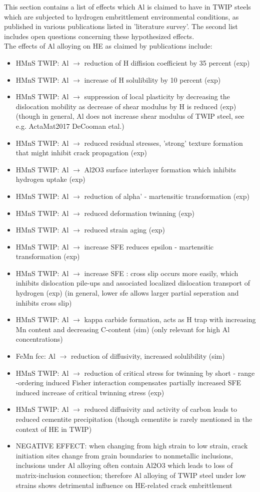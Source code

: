 \documentclass[11pt,floatfix,showpacs]{amsart}
\begin{document}
This section contains a list of effects which Al is claimed to have in TWIP steels which are subjected to hydrogen embrittlement 
environmental conditions, as published in various publications listed in 'literature survey'. The second list includes open questions concerning these hypothesized effects.\\


The effects of Al alloying on HE as claimed by publications include:
\begin{itemize}
\item HMnS TWIP: Al $\to$ reduction of H diffision coefficient by 35 percent (exp)
\item HMnS TWIP: Al $\to$ increase of H solulibility by 10 percent (exp)
\item HMnS TWIP: Al $\to$ suppression of local plasticity by decreasing the dislocation mobility as decrease of shear modulus by H is reduced (exp) (though in general, Al does not increase shear modulus of TWIP steel, see e.g. ActaMat2017 DeCooman etal.)
\item HMnS TWIP: Al $\to$ reduced residual stresses, 'strong' texture formation that might inhibit crack propagation (exp)
\item HMnS TWIP: Al $\to$ Al2O3 surface interlayer formation which inhibits hydrogen uptake (exp)
\item HMnS TWIP: Al $\to$ reduction of alpha' - martensitic transformation (exp)
\item HMnS TWIP: Al $\to$ reduced deformation twinning (exp)
\item HMnS TWIP: Al $\to$ reduced strain aging (exp)
\item HMnS TWIP: Al $\to$ increase SFE reduces epsilon - martensitic transformation (exp)
\item HMnS TWIP: Al $\to$ increase SFE : cross slip occurs more easily, which inhibits dislocation pile-ups and associated localized dislocation transport of hydrogen (exp) (in general, lower sfe allows larger partial seperation and inhibits cross slip)
\item HMnS TWIP: Al $\to$ kappa carbide formation, acts as H trap with increasing Mn content and decreasing C-content (sim) (only relevant for high Al concentrations)
\item FeMn fcc: Al $\to$ reduction of diffusivity, increased solulibility (sim)
\item HMnS TWIP: Al $\to$ reduction of critical stress for twinning by short - range -ordering induced Fisher interaction compensates partially increased SFE induced increase of critical twinning stress (exp)
\item HMnS TWIP: Al $\to$ reduced diffusivity and activity of carbon leads to reduced cementite precipitation (though cementite is rarely mentioned in the context of HE in TWIP)
\item NEGATIVE EFFECT: when changing from high strain to low strain, crack initiation sites change from grain boundaries to nonmetallic inclusions, inclusions under Al alloying often contain Al2O3 which leads to loss of matrix-inclusion connection; therefore Al alloying of TWIP steel under low strains shows detrimental influence on HE-related crack embrittlement
\end{itemize}
\end{document}
